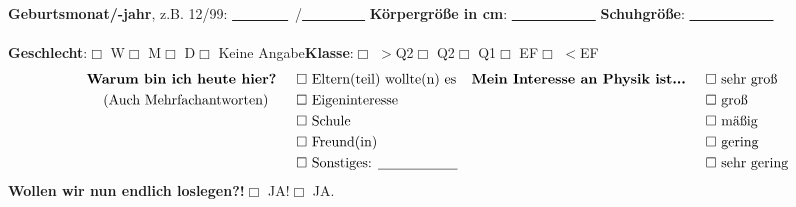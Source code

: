 \textbf{Geburtsmonat/-jahr}, \textsf{z.B. 12/99}: \underline{~~~~~~~~}~/\underline{~~~~~~~~~}\hspace{1cm} \textbf{Körpergröße in cm}: \underline{~~~~~~~~~~~~}\hspace{1cm} \textbf{Schuhgröße}: \underline{~~~~~~~~~~~~} \\ 
\vspace{0.2cm}\\
\textbf{Geschlecht}:\hspace{0.4cm}$\Box$ W\hspace{0.5cm}$\Box$ M\hspace{0.5cm}$\Box$ D\hspace{0.5cm}$\Box$ Keine Angabe\hspace{1cm}\textbf{Klasse}:\hspace{0.5cm}$\Box$ $>$Q2\hspace{0.5cm}$\Box$ Q2\hspace{0.5cm}$\Box$ Q1\hspace{0.5cm}$\Box$ EF\hspace{0.5cm}$\Box$ $<$EF \\
\begin{align*}
 \textmd{\textbf{Warum bin ich heute hier?}} \hspace{0.5cm}& \Box \textmd{ Eltern(teil) wollte(n) es} &\textmd{\textbf{Mein Interesse an Physik ist...}}  \hspace{0.5cm}& \Box \textmd{ sehr groß}\\
\textmd{(Auch Mehrfachantworten)}   \hspace{0.7cm}&\Box \textmd{ Eigeninteresse} && \Box \textmd{ groß}\\
    &\Box \textmd{ Schule} && \Box \textmd{ mäßig}\\
    &\Box \textmd{ Freund(in)} && \Box \textmd{ gering}\\
    &\Box \textmd{ Sonstiges: \underline{\hspace{2cm}}} && \Box \textmd{ sehr gering}
\end{align*}
\textbf{Wollen wir nun endlich loslegen?!}\hspace{0.5cm}$\Box$ JA!\hspace{0.5cm}$\Box$ JA. \\


